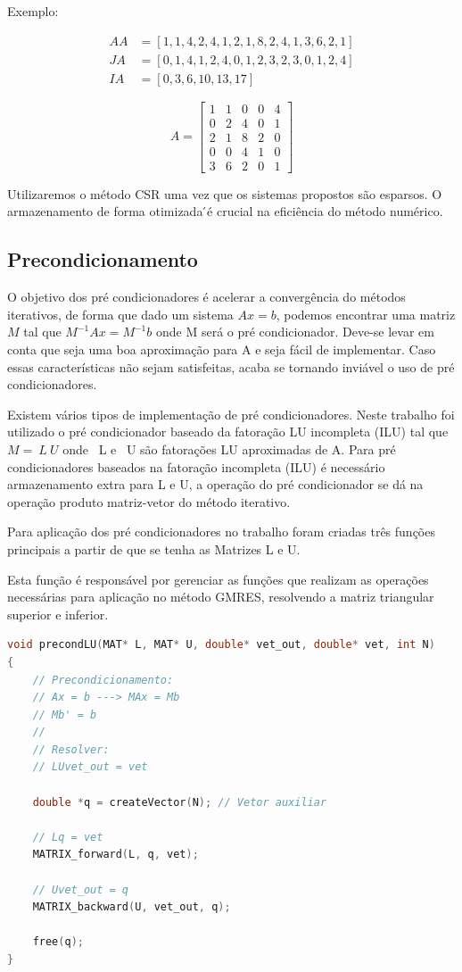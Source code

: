\documentclass[
	11pt,				%
	oneside,			%
	a4paper,			%
	english,			%
	brazil,				%
	]{article}
\begin{document}
\noindent Exemplo:

\begin{align*}
AA &= [1, 1, 4, 2, 4, 1, 2, 1, 8, 2, 4, 1, 3, 6, 2, 1] \\
JA &= [0, 1, 4, 1, 2, 4, 0, 1, 2, 3, 2, 3, 0, 1, 2, 4] \\
IA &= [0, 3, 6, 10, 13, 17]
\end{align*}

\begin{equation*}
A = 
\begin{bmatrix}
  1 & 1 & 0 & 0 & 4 \\
  0 & 2 & 4 & 0 & 1 \\
  2 & 1 & 8 & 2 & 0 \\
  0 & 0 & 4 & 1 & 0 \\
  3 & 6 & 2 & 0 & 1
\end{bmatrix}
\end{equation*}

Utilizaremos o método CSR uma vez que os sistemas propostos são esparsos. O armazenamento de forma otimizada ́é crucial na eficiência do método numérico.

\subsection{Precondicionamento}
O objetivo dos pré condicionadores é acelerar a convergência do métodos iterativos, de forma que dado um sistema $Ax = b$, podemos encontrar uma matriz $M$ tal que  $M^{-1} Ax = M^{-1}b$ onde M será o pré condicionador. Deve-se levar em conta que seja uma boa aproximação para A e seja fácil de implementar. Caso essas características não sejam satisfeitas, acaba se tornando inviável o uso de pré condicionadores.

Existem vários tipos de implementação de pré condicionadores. Neste trabalho foi utilizado o pré condicionador baseado da fatoração LU incompleta (ILU) tal que $M = ~L~U$ onde ~L e ~U são fatorações LU aproximadas de A. Para pré condicionadores baseados na fatoração incompleta (ILU) é necessário armazenamento extra para L e U, a operação do pré condicionador se dá na operação produto matriz-vetor do método iterativo.

Para aplicação dos pré condicionadores no trabalho foram criadas três funções principais a partir de que se tenha as Matrizes L e U.

Esta função é responsável por gerenciar as funções que realizam as operações necessárias para aplicação no método GMRES, resolvendo a matriz triangular superior e inferior.
\begin{lstlisting}[language=C, caption=Aplicação Pré Condicionamento LU]
void precondLU(MAT* L, MAT* U, double* vet_out, double* vet, int N)
{
    // Precondicionamento:
    // Ax = b ---> MAx = Mb
    // Mb' = b
    //
    // Resolver:
    // LUvet_out = vet

    double *q = createVector(N); // Vetor auxiliar

    // Lq = vet
    MATRIX_forward(L, q, vet);

    // Uvet_out = q
    MATRIX_backward(U, vet_out, q);

    free(q);
}
\end{lstlisting}
\end{document}
